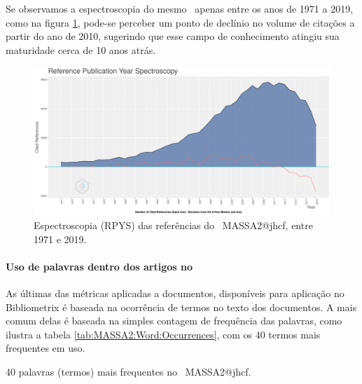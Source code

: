 Se observamos a espectroscopia do mesmo \dataset\ apenas entre os anos de 1971 a 2019, como na figura \ref{fig:MASSA2-ReferenceSpectroscopy:1971:2019}, pode-se perceber um ponto de declínio no volume de citações a partir do ano de 2010, sugerindo que esse campo de conhecimento atingiu sua maturidade cerca de 10 anos atrás.

\begin{figure}
    \centering
    \includegraphics[width=1\textwidth]{experiments/jhcf/PesqBibliogr/SimulacaoMultiagente/WoS-20220203/Metricas/Documentos/MASSA2-ReferenceSpectroscopy-1971-2019.png}
    \caption{Espectroscopia (RPYS) das referências do \dataset\ MASSA2@jhcf, entre 1971 e 2019.}
    \label{fig:MASSA2-ReferenceSpectroscopy:1971:2019}
\end{figure}

\paragraph{Uso de palavras dentro dos artigos no \dataset}

As últimas das métricas aplicadas a documentos, disponíveis para aplicação no Bibliometrix é baseada na ocorrência de termos no texto dos documentos. A mais comum delas é baseada na simples contagem de frequência das palavras, como ilustra a tabela \ref{tab:MASSA2:Word:Occurrences}, com os 40 termos mais frequentes em uso.

\begin{table}[htp]
    \centering
\footnotesize
{}

    \caption{40 palavras (termos) mais frequentes no \dataset\ MASSA2@jhcf.}
    \label{tab:MASSA2:Word:Occurrences}
\end{table}

